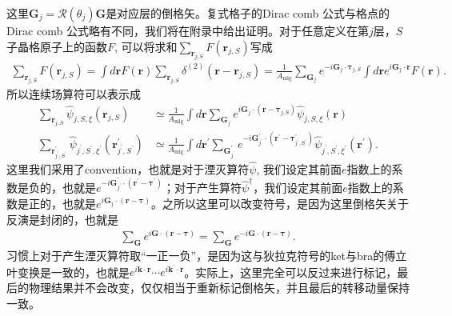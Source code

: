 \documentclass[10pt, oneside]{article}
\begin{document}
这里\(\bm{G}_{j} = \mathcal{R} \left(\theta_{j}\right)\bm{G}\)是对应层的倒格矢。复式格子的Dirac comb 公式与格点的Dirac comb 公式略有不同，我们将在附录中给出证明。对于任意定义在第\(j\)层，\(S\)子晶格原子上的函数\(F\), 可以将求和\(\sum_{\bm{r}_{j,S}} F \left(\bm{r}_{j,S}\right)\)写成
\begin{align}
	\sum_{\bm{r}_{j,S}} F \left(\bm{r}_{j,S}\right) = \int d \bm{r} F \left(\bm{r}\right) \sum_{\bm{r}_{j,S}} \delta^{\left(2\right)} \left(\bm{r} - \bm{r}_{j,S}\right) = \frac{1}{A_{\mathrm{mlg}}} \sum_{\bm{G}_{j}} e^{-i \bm{G}_{j} \cdot \bm{\tau}_{j, S}} \int d \bm{r} e^{i \bm{G}_{j} \cdot \bm{r}} F \left(\bm{r}\right).
\end{align}
所以连续场算符可以表示成
\begin{align}
	\sum_{\bm{r}_{j,S}} \hat{\psi}_{j,S,\xi} \left(\bm{r}_{j,S}	\right) &\simeq \frac{1}{A_{\mathrm{mlg}}} \int d \bm{r} \sum_{\bm{G}_{j}} e^{i \bm{G}_{j} \cdot \left(\bm{r} - \bm{\tau}_{j,S}\right)} \hat{\psi}_{j,S,\xi} \left(\bm{r}\right) \\
	\sum_{\bm{r}^{\prime}_{j^{\prime}, S^{\prime}}} \hat{\psi}_{j^{\prime}, S^{\prime}, \xi^{\prime}} \left(\bm{r}^{\prime}_{j^{\prime}, S^{\prime}}\right) & \simeq  \frac{1}{A_{\mathrm{mlg}}} \int d \bm{r}^{\prime} \sum_{\bm{G}^{\prime}_{j^{\prime}}} e^{-i \bm{G}^{\prime}_{j^{\prime}} \cdot \left(\bm{r}^{\prime} - \bm{\tau}^{\prime}_{j^{\prime}, S^{\prime}}\right)} \hat{\psi}_{j^{\prime}, S^{\prime}, \xi^{\prime}} \left(\bm{r}^{\prime}\right).
\end{align}
这里我们采用了convention，也就是对于湮灭算符\(\hat{\psi}\), 我们设定其前面\(e\)指数上的系数是负的，也就是\(e^{-i \bm{G}^{\prime}_{j^{\prime}} \cdot \left(\bm{r}^{\prime} - \bm{\tau}^{\prime}\right)  }\)；对于产生算符\(\hat{\psi}^{\dagger}\)，我们设定其前面\(e\)指数上的系数是正的，也就是\(e^{i \bm{G}_{j} \cdot \left(\bm{r} - \bm{\tau}\right)}\)。之所以这里可以改变符号，是因为这里倒格矢关于反演是封闭的，也就是
\begin{align}
	\sum_{\bm{G}} e^{i \bm{G} \cdot \left( \bm{r} - \bm{\tau}\right)} = \sum_{\bm{G}} e^{-i \bm{G} \cdot \left( \bm{r} - \bm{\tau}\right)}.
\end{align}
习惯上对于产生湮灭算符取“一正一负”，是因为这与狄拉克符号的ket与bra的傅立叶变换是一致的，也就是\(e^{i \bm{k} \cdot \bm{r}} \cdots e^{i \bm{k}^{\prime} \cdot \bm{r}}\)。实际上，这里完全可以反过来进行标记，最后的物理结果并不会改变，仅仅相当于重新标记倒格矢，并且最后的转移动量保持一致。
\end{document}
